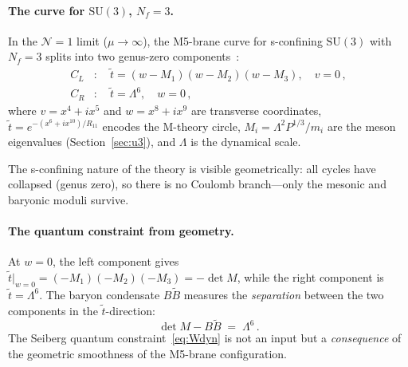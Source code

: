 \documentclass[12pt,a4paper]{article}
\newcommand{\SU}{\mathrm{SU}}
\newcommand{\Nf}{N_f}
\begin{document}
\paragraph{The curve for $\SU(3)$, $\Nf = 3$.}
In the $\mathcal{N} = 1$ limit ($\mu \to \infty$), the M5-brane
curve for s-confining $\SU(3)$ with $\Nf = 3$ splits into two
genus-zero components~\cite{HoriOoguriOz:1997}:
\begin{align}
  C_L &:\quad \tilde{t} = (w - M_1)(w - M_2)(w - M_3),\quad v = 0\,,
  \label{eq:CL} \\
  C_R &:\quad \tilde{t} = \Lambda^6,\quad w = 0\,,
  \label{eq:CR}
\end{align}
where $v = x^4 + ix^5$ and $w = x^8 + ix^9$ are transverse
coordinates, $\tilde{t} = e^{-(x^6 + ix^{10})/R_{11}}$ encodes the
M-theory circle, $M_i = \Lambda^2 P^{1/3}/m_i$ are the meson
eigenvalues (Section~\ref{sec:u3}), and $\Lambda$ is the
dynamical scale.

The s-confining nature of the theory is visible geometrically:
all cycles have collapsed (genus zero), so there is no Coulomb
branch---only the mesonic and baryonic moduli survive.

\paragraph{The quantum constraint from geometry.}
At $w = 0$, the left component gives
$\tilde{t}\big|_{w=0} = (-M_1)(-M_2)(-M_3) = -\det M$,
while the right component is $\tilde{t} = \Lambda^6$.
The baryon condensate $B\tilde{B}$ measures the
\emph{separation} between the two components in the
$\tilde{t}$-direction:
\begin{equation}
  \det M - B\tilde{B} \;=\; \Lambda^6\,.
  \label{eq:constraint_brane}
\end{equation}
The Seiberg quantum constraint~\eqref{eq:Wdyn} is not an input
but a \emph{consequence} of the geometric smoothness of the
M5-brane configuration.
\end{document}
